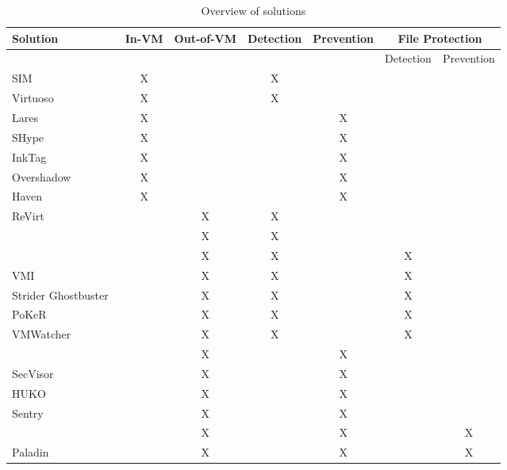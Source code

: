 \begin{table}[h]
	\centering
	\caption{Overview of solutions}
	\label{tbl:overview}
	\begin{tabular}{lcccccc}
		\toprule
		Solution & In-VM & Out-of-VM & Detection & Prevention  & \multicolumn{2}{c}{File Protection}  \\
		\hline
		&		 &			 &  &  & \scriptsize {Detection} & \scriptsize {Prevention} \\
		\hline
		SIM~\cite{sharif2009secure} 					& X &   & X &   &   & \\
		Virtuoso~\cite{dolan2011virtuoso} 				& X &   & X &   &   & \\
		Lares~\cite{payne2008lares} 					& X &   &   & X &   & \\
		SHype~\cite{sailer2005building}					& X &   &   & X &   & \\
		InkTag~\cite{hofmann2013inktag}					& X &   &   & X &   & \\
		Overshadow~\cite{chen2008overshadow}			& X &   &   & X &   & \\
		Haven~\cite{baumann2015shielding}				& X &   &   & X &   & \\
		ReVirt~\cite{dunlap2002revirt}					&   & X & X &   &   & \\
		~\cite{macko2011collecting}						&   & X & X &   &   & \\
		~\cite{crawford2013insider}						&   & X & X &   & X & \\
		VMI~\cite{garfinkel2003virtual}					&   & X & X &   & X & \\
		Strider Ghostbuster~\cite{wang2005detecting}	&   & X & X &   & X & \\
		PoKeR~\cite{riley2009multi}						&   & X & X &   & X & \\
		VMWatcher~\cite{jiang2007stealthy}				&   & X & X &   & X & \\
		~\cite{srinivasan2011process}					&   & X &   & X &   &  \\
		SecVisor~\cite{seshadri2007secvisor} 			&   & X &   & X &   &  \\
		HUKO~\cite{xiong2011practical}					&   & X &   & X &   &  \\
		Sentry~\cite{srivastava2012efficient}			&   & X &   & X &   &  \\
		~\cite{nasab2012security}						&   & X &   & X &   &  X\\
		Paladin~\cite{baliga2008automated}				&   & X &   & X &   &  X\\
		\bottomrule
	\end{tabular}	
\end{table}


